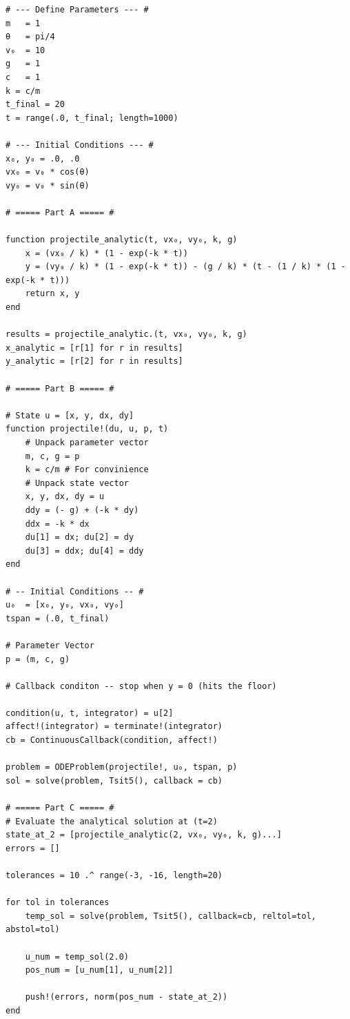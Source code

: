 \begin{verbatim}
# --- Define Parameters --- #
m   = 1
θ   = pi/4
v₀  = 10
g   = 1
c   = 1
k = c/m
t_final = 20
t = range(.0, t_final; length=1000)

# --- Initial Conditions --- #
x₀, y₀ = .0, .0
vx₀ = v₀ * cos(θ)
vy₀ = v₀ * sin(θ)

# ===== Part A ===== #

function projectile_analytic(t, vx₀, vy₀, k, g)
    x = (vx₀ / k) * (1 - exp(-k * t))
    y = (vy₀ / k) * (1 - exp(-k * t)) - (g / k) * (t - (1 / k) * (1 - exp(-k * t)))
    return x, y
end

results = projectile_analytic.(t, vx₀, vy₀, k, g)
x_analytic = [r[1] for r in results]
y_analytic = [r[2] for r in results]

# ===== Part B ===== #

# State u = [x, y, dx, dy]
function projectile!(du, u, p, t)
    # Unpack parameter vector
    m, c, g = p
    k = c/m # For convinience
    # Unpack state vector
    x, y, dx, dy = u
    ddy = (- g) + (-k * dy)
    ddx = -k * dx
    du[1] = dx; du[2] = dy
    du[3] = ddx; du[4] = ddy
end

# -- Initial Conditions -- #
u₀  = [x₀, y₀, vx₀, vy₀]
tspan = (.0, t_final)

# Parameter Vector
p = (m, c, g)

# Callback conditon -- stop when y = 0 (hits the floor)

condition(u, t, integrator) = u[2]
affect!(integrator) = terminate!(integrator)
cb = ContinuousCallback(condition, affect!)

problem = ODEProblem(projectile!, u₀, tspan, p)
sol = solve(problem, Tsit5(), callback = cb)

# ===== Part C ===== #
# Evaluate the analytical solution at (t=2)
state_at_2 = [projectile_analytic(2, vx₀, vy₀, k, g)...]
errors = []

tolerances = 10 .^ range(-3, -16, length=20)

for tol in tolerances
    temp_sol = solve(problem, Tsit5(), callback=cb, reltol=tol, abstol=tol)
    
    u_num = temp_sol(2.0)
    pos_num = [u_num[1], u_num[2]]
    
    push!(errors, norm(pos_num - state_at_2))
end
\end{verbatim}

